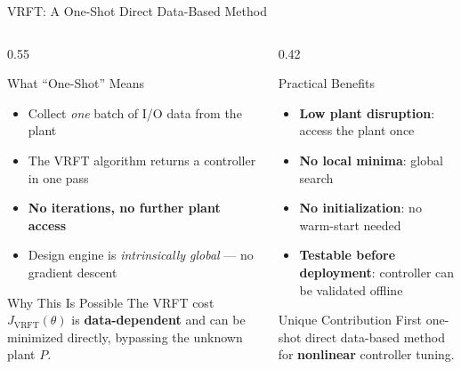 \documentclass[aspectratio=169]{beamer}
\newcommand{\highlight}[1]{{\color{accentgreen!70!black}\textbf{#1}}}
\newcommand{\alerttext}[1]{{\color{alertred}\textbf{#1}}}
\newcommand{\JJ}{J_{\mathrm{VRFT}}}
\begin{document}
\begin{frame}{VRFT: A One-Shot Direct Data-Based Method}
  \begin{columns}[T]
    \begin{column}{0.55\textwidth}
      \begin{block}{What ``One-Shot'' Means}
        \begin{itemize}
          \item Collect \emph{one} batch of I/O data from the plant
          \item The VRFT algorithm returns a controller in one pass
          \item \highlight{No iterations, no further plant access}
          \item Design engine is \emph{intrinsically global} --- no gradient descent
        \end{itemize}
      \end{block}
      \vspace{0.4em}
      \begin{block}{Why This Is Possible}
        The VRFT cost $\JJ(\theta)$ is \highlight{data-dependent} and can be minimized directly, bypassing the unknown plant $P$.
      \end{block}
    \end{column}
    \begin{column}{0.42\textwidth}
      \begin{exampleblock}{Practical Benefits}
        \begin{itemize}
          \item \textbf{Low plant disruption}: access the plant once
          \item \textbf{No local minima}: global search
          \item \textbf{No initialization}: no warm-start needed
          \item \textbf{Testable before deployment}: controller can be validated offline
        \end{itemize}
      \end{exampleblock}
      \vspace{0.4em}
      \begin{alertblock}{Unique Contribution}
        \centering
        First one-shot direct data-based method for \alerttext{nonlinear} controller tuning.
      \end{alertblock}
    \end{column}
  \end{columns}
\end{frame}
\end{document}
